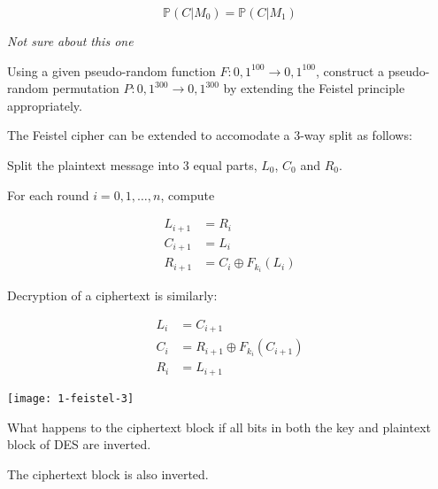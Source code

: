 \documentclass{supervision}
\begin{document}
\begin{questions}
\begin{parts}
          \begin{equation*}
            \mathbb{P}(C|M_0) = \mathbb{P}(C|M_1)
          \end{equation*}

          \begin{solution}
            \emph{Not sure about this one}
          \end{solution}
      \end{parts}

    \question Using a given pseudo-random function $F : {0,1}^{100} \rightarrow
      {0,1}^{100}$, construct a pseudo-random permutation $P: {0,1}^{300}
      \rightarrow {0,1}^{300}$ by extending the Feistel principle appropriately.

      \begin{solution}
        The Feistel cipher can be extended to accomodate a 3-way split as
        follows:

        Split the plaintext message into 3 equal parts, $L_0$, $C_0$ and $R_0$.

        For each round $i = 0, 1, \ldots , n$, compute

        \begin{align*}
          L_{i+1} &= R_i                     \\
          C_{i+1} &= L_i                     \\
          R_{i+1} &= C_i \oplus F_{k_i}(L_i)
        \end{align*}

        Decryption of a ciphertext is similarly:

        \begin{align*}
          L_{i} &= C_{i+1}                         \\
          C_{i} &= R_{i+1} \oplus F_{k_i}(C_{i+1}) \\
          R_{i} &= L_{i+1}
        \end{align*}

        \begin{center}
          \texttt{[image: 1-feistel-3]}
        \end{center}
      \end{solution}

    \question What happens to the ciphertext block if all bits in both the key
      and plaintext block of DES are inverted.

      \begin{solution}
        The ciphertext block is also inverted.


\end{solution}
\end{questions}
\end{document}
